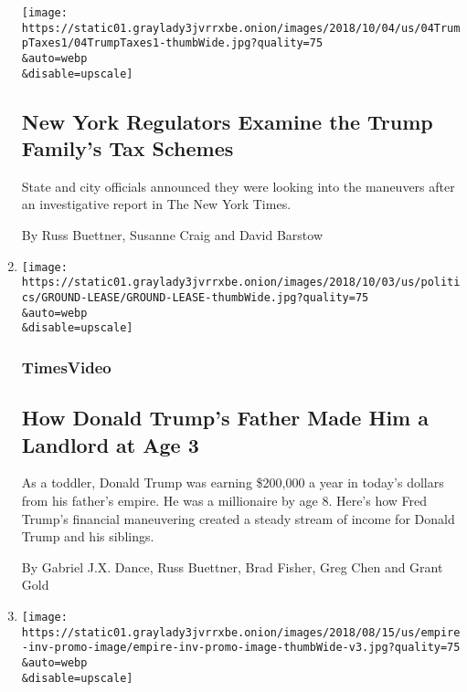 \begin{enumerate}
  \texttt{[image: https://static01.graylady3jvrrxbe.onion/images/2018/10/04/us/04TrumpTaxes1/04TrumpTaxes1-thumbWide.jpg?quality=75\\\&auto=webp\\\&disable=upscale]}

  \hypertarget{new-york-regulators-examine-the-trump-familys-tax-schemes}{%
  \subsection{New York Regulators Examine the Trump Family's Tax
  Schemes}\label{new-york-regulators-examine-the-trump-familys-tax-schemes}}

  State and city officials announced they were looking into the
  maneuvers after an investigative report in The New York Times.

  By Russ Buettner, Susanne Craig and David Barstow
\item
  \href{/video/us/politics/100000006142467/-donald-fred-trump-taxes-ground-lease.html}{}

  \texttt{[image: https://static01.graylady3jvrrxbe.onion/images/2018/10/03/us/politics/GROUND-LEASE/GROUND-LEASE-thumbWide.jpg?quality=75\\\&auto=webp\\\&disable=upscale]}

  \hypertarget{timesvideo}{%
  \subsubsection{TimesVideo}\label{timesvideo}}

  \hypertarget{how-donald-trumps-father-made-him-a-landlord-at-age-3}{%
  \subsection{How Donald Trump's Father Made Him a Landlord at Age
  3}\label{how-donald-trumps-father-made-him-a-landlord-at-age-3}}

  As a toddler, Donald Trump was earning \$200,000 a year in today's
  dollars from his father's empire. He was a millionaire by age 8.
  Here's how Fred Trump's financial maneuvering created a steady stream
  of income for Donald Trump and his siblings.

  By Gabriel J.X. Dance, Russ Buettner, Brad Fisher, Greg Chen and Grant
  Gold
\item
  \href{/interactive/2018/10/02/us/politics/trump-family-wealth.html}{}

  \texttt{[image: https://static01.graylady3jvrrxbe.onion/images/2018/08/15/us/empire-inv-promo-image/empire-inv-promo-image-thumbWide-v3.jpg?quality=75\\\&auto=webp\\\&disable=upscale]}


\end{enumerate}
